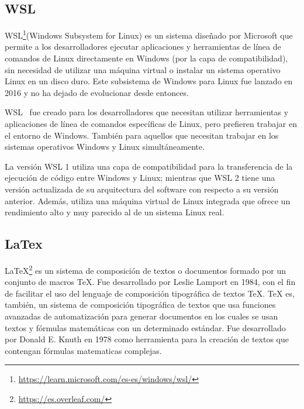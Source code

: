 \documentclass[a4paper, 12pt]{book}
\begin{document}
\subsection{WSL} %
\label{sec:wsl} %

WSL\footnote{\url{https://learn.microsoft.com/es-es/windows/wsl/}}(Windows Subsystem for Linux) es un sistema diseñado por Microsoft que permite a los desarrolladores ejecutar aplicaciones y herramientas de línea de comandos de Linux directamente en Windows (por la capa de compatibilidad), sin necesidad de utilizar una máquina virtual o instalar un sistema operativo Linux en un disco duro. 
Este subsistema de Windows para Linux fue lanzado en 2016 y no ha dejado de evolucionar desde entonces. 


WSL~\cite{medriforensic} fue creado para los desarrolladores que necesitan utilizar herramientas y aplicaciones de línea de comandos específicas de Linux, pero prefieren trabajar en el entorno de Windows. 
También para aquellos que necesitan trabajar en los sistemas operativos Windows y Linux simultáneamente.


La versión WSL 1 utiliza una capa de compatibilidad para la transferencia de la ejecución de código entre Windows y Linux;
mientras que WSL 2 tiene una versión actualizada de su arquitectura del software con respecto a su versión anterior. 
Además, utiliza una máquina virtual de Linux integrada que ofrece un rendimiento alto y muy parecido al de un sistema Linux real.


\subsection{LaTex} %
\label{sec:latex} %

LaTeX\footnote{\url{https://es.overleaf.com/}} es un sistema de composición de textos o documentos formado por un conjunto de macros TeX. 
Fue desarrollado por Leslie Lamport en 1984, con el fin de facilitar el uso del lenguaje de composición tipográfica de textos TeX.
TeX es, también, un sistema de composición tipográfica de textos que usa funciones avanzadas de automatización para generar documentos en los cuales se usan textos y fórmulas matemáticas con un determinado estándar.
Fue desarrollado por Donald E. Knuth en 1978 como herramienta para la creación de textos que contengan fórmulas matematicas complejas.
\end{document}
